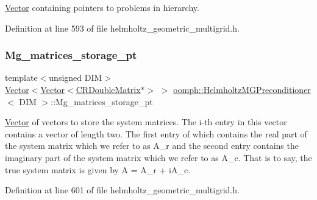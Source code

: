 \hyperlink{classoomph_1_1Vector}{Vector} containing pointers to problems in hierarchy. 



Definition at line 593 of file helmholtz\+\_\+geometric\+\_\+multigrid.\+h.

\mbox{\label{classoomph_1_1HelmholtzMGPreconditioner_ae916b035dd57061a64cef1314ef50d0c}} 
\subsubsection{\texorpdfstring{Mg\+\_\+matrices\+\_\+storage\+\_\+pt}{Mg\_matrices\_storage\_pt}}
{\footnotesize\ttfamily template$<$unsigned D\+IM$>$ \\
\hyperlink{classoomph_1_1Vector}{Vector}$<$\hyperlink{classoomph_1_1Vector}{Vector}$<$\hyperlink{classoomph_1_1CRDoubleMatrix}{C\+R\+Double\+Matrix}$\ast$$>$ $>$ \hyperlink{classoomph_1_1HelmholtzMGPreconditioner}{oomph\+::\+Helmholtz\+M\+G\+Preconditioner}$<$ D\+IM $>$\+::Mg\+\_\+matrices\+\_\+storage\+\_\+pt\hspace{0.3cm}{\ttfamily [private]}}



\hyperlink{classoomph_1_1Vector}{Vector} of vectors to store the system matrices. The i-\/th entry in this vector contains a vector of length two. The first entry of which contains the real part of the system matrix which we refer to as A\+\_\+r and the second entry contains the imaginary part of the system matrix which we refer to as A\+\_\+c. That is to say, the true system matrix is given by A = A\+\_\+r + i\+A\+\_\+c. 



Definition at line 601 of file helmholtz\+\_\+geometric\+\_\+multigrid.\+h.

\mbox{\label{classoomph_1_1HelmholtzMGPreconditioner_abfc68dd81954261a2d5dbdc891c4aa67}} 
